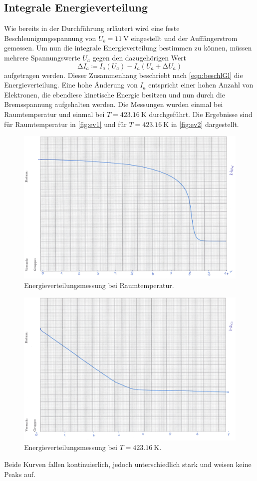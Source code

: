 \subsection{Integrale Energieverteilung}
\label{sec:ie}
Wie bereits in der Durchführung erläutert wird eine feste Beschleunigungsspannung von $U_b = \SI{11}{\volt}$ eingestellt und der Auffängerstrom gemessen.
Um nun die integrale Energieverteilung bestimmen zu können, müssen mehrere Spannungswerte $U_a$ gegen den dazugehörigen Wert
\begin{equation}
  \increment I_a \coloneq I_a(U_a) - I_a(U_a + \increment U_a)
\end{equation}
aufgetragen werden.
Dieser Zusammenhang beschriebt nach \autoref{eqn:beschlGl} die Energieverteilung. Eine hohe Änderung von $I_a$ entspricht einer hohen Anzahl von Elektronen,
die ebendiese kinetische Energie besitzen und nun durch die Bremsspannung aufgehalten werden.
\newline
Die Messungen wurden einmal bei Raumtemperatur und einmal bei $T = \SI{423,16}{\kelvin}$ durchgeführt. Die Ergebnisse sind für Raumtemperatur in \autoref{fig:ev1} und für
$T = \SI{423,16}{\kelvin}$ in \autoref{fig:ev2} dargestellt.

\begin{figure}[H]
	\centering
	\includegraphics[width=0.7\linewidth]{data/EnergieverteilungRT.png}
	\caption{Energieverteilungsmessung bei Raumtemperatur.}
	\label{fig:ev1}
\end{figure}

\begin{figure}[H]
	\centering
	\includegraphics[width=0.7\linewidth]{data/Energieverteilung150C.png}
	\caption{Energieverteilungsmessung bei $T = \SI{423,16}{\kelvin}$.}
	\label{fig:ev2}
\end{figure}
\noindent
Beide Kurven fallen kontinuierlich, jedoch unterschiedlich stark und weisen keine Peaks auf.

